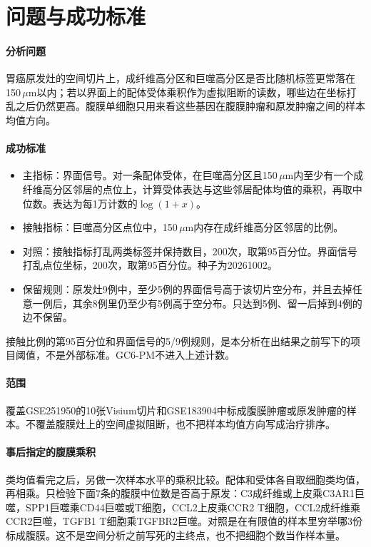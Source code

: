 \section{问题与成功标准}
\label{sec:problem}

\paragraph{分析问题}
胃癌原发灶的空间切片上，成纤维高分区和巨噬高分区是否比随机标签更常落在150\,$\mu$m以内；若以界面上的配体受体乘积作为虚拟阻断的读数，哪些边在坐标打乱之后仍然更高。腹膜单细胞只用来看这些基因在腹膜肿瘤和原发肿瘤之间的样本均值方向。

\paragraph{成功标准}
\begin{itemize}
  \item 主指标：界面信号。对一条配体受体，在巨噬高分区且150\,$\mu$m内至少有一个成纤维高分区邻居的点位上，计算受体表达与这些邻居配体均值的乘积，再取中位数。表达为每1万计数的$\log(1+x)$。
  \item 接触指标：巨噬高分区点位中，150\,$\mu$m内存在成纤维高分区邻居的比例。
  \item 对照：接触指标打乱两类标签并保持数目，200次，取第95百分位。界面信号打乱点位坐标，200次，取第95百分位。种子为20261002。
  \item 保留规则：原发灶9例中，至少5例的界面信号高于该切片空分布，并且去掉任意一例后，其余8例里仍至少有5例高于空分布。只达到5例、留一后掉到4例的边不保留。
\end{itemize}

接触比例的第95百分位和界面信号的5/9例规则，是本分析在出结果之前写下的项目阈值，不是外部标准。GC6-PM不进入上述计数。

\paragraph{范围}
覆盖GSE251950的10张Visium切片和GSE183904中标成腹膜肿瘤或原发肿瘤的样本。不覆盖腹膜灶上的空间虚拟阻断，也不把样本均值方向写成治疗排序。

\paragraph{事后指定的腹膜乘积}
类均值看完之后，另做一次样本水平的乘积比较。配体和受体各自取细胞类均值，再相乘。只检验下面7条的腹膜中位数是否高于原发：C3成纤维或上皮乘C3AR1巨噬，SPP1巨噬乘CD44巨噬或T细胞，CCL2上皮乘CCR2 T细胞，CCL2成纤维乘CCR2巨噬，TGFB1 T细胞乘TGFBR2巨噬。对照是在有限值的样本里穷举哪3份标成腹膜。这不是空间分析之前写死的主终点，也不把细胞个数当作样本量。
